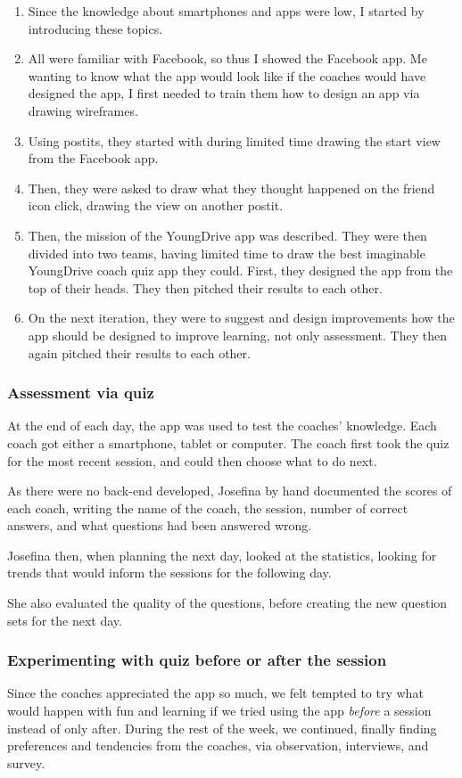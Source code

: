 \begin{enumerate}
\item Since the knowledge about smartphones and apps were low, I started by introducing these topics.
\item All were familiar with Facebook, so thus I showed the Facebook app. Me wanting to know what the app would look like if the coaches would have designed the app, I first needed to train them how to design an app via drawing wireframes.
\item Using postits, they started with during limited time drawing the start view from the Facebook app.
\item Then, they were asked to draw what they thought happened on the friend icon click, drawing the view on another postit.
\item Then, the mission of the YoungDrive app was described. They were then divided into two teams, having limited time to draw the best imaginable YoungDrive coach quiz app they could. First, they designed the app from the top of their heads. They then pitched their results to each other.
\item On the next iteration, they were to suggest and design improvements how the app should be designed to improve learning, not only assessment. They then again pitched their results to each other.
\end{enumerate}

\subsubsection{Assessment via quiz}
At the end of each day, the app was used to test the coaches' knowledge. Each coach got either a smartphone, tablet or computer. The coach first took the quiz for the most recent session, and could then choose what to do next.

As there were no back-end developed, Josefina by hand documented the scores of each coach, writing the name of the coach, the session, number of correct answers, and what questions had been answered wrong.

Josefina then, when planning the next day, looked at the statistics, looking for trends that would inform the sessions for the following day.

She also evaluated the quality of the questions, before creating the new question sets for the next day.

\subsubsection{Experimenting with quiz before or after the session}
Since the coaches appreciated the app so much, we felt tempted to try what would happen with fun and learning if we tried using the app \textit{before} a session instead of only after. During the rest of the week, we continued, finally finding preferences and tendencies from the coaches, via observation, interviews, and survey.

